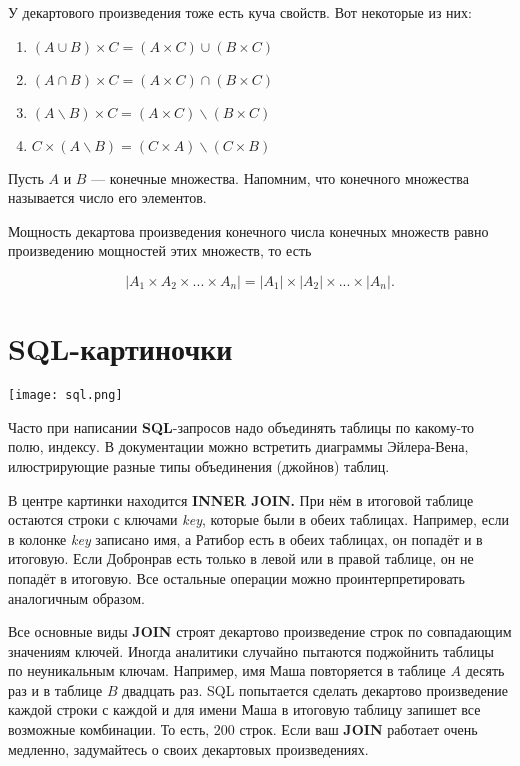 \documentclass[12pt, a4paper]{article}
\begin{document}
У декартового произведения тоже есть куча свойств. Вот некоторые из них:

\begin{enumerate}
    \item $(A \cup B) \times C = (A \times C) \cup (B \times C)$
    \item $(A \cap B) \times C = (A \times C) \cap (B \times C)$
    \item $(A \backslash B) \times C = (A \times C) \backslash (B \times C)$
    \item $C \times  (A \backslash B) = (C \times A) \backslash (C \times B)$
\end{enumerate}

Пусть $A$ и $B$ --- конечные множества. Напомним, что  конечного множества называется число его элементов. 

\begin{myth}
Мощность декартова произведения конечного числа конечных множеств равно произведению мощностей этих множеств, то есть 

\[
|A_1 \times A_2 \times ... \times  A_n| = |A_1| \times |A_2| \times ... \times |A_n|.
\]
\end{myth}

\section{SQL-картиночки}

\begin{center}
    \texttt{[image: sql.png]}
\end{center}

Часто при написании \textbf{SQL}-запросов надо объединять таблицы по какому-то полю, индексу. В документации можно встретить диаграммы Эйлера-Вена, илюстрирующие разные типы объединения (джойнов) таблиц.

В центре картинки находится \textbf{INNER JOIN.} При нём в итоговой таблице остаются строки с ключами \textit{key}, которые были в обеих таблицах. Например, если в колонке  \textit{key} записано имя, а Ратибор есть в обеих таблицах, он попадёт и в итоговую. Если Добронрав есть только в левой или в правой таблице, он не попадёт в итоговую. Все остальные операции можно проинтерпретировать аналогичным образом.

Все основные виды \textbf{JOIN} строят декартово произведение строк по совпадающим значениям ключей. Иногда аналитики случайно пытаются поджойнить таблицы по неуникальным ключам. Например, имя Маша повторяется в таблице $A$ десять раз и в таблице $B$ двадцать раз. SQL попытается сделать декартово произведение каждой строки с каждой и для имени Маша в итоговую таблицу запишет все возможные комбинации. То есть, $200$ строк. Если ваш \textbf{JOIN} работает очень медленно, задумайтесь о своих декартовых произведениях. 
\end{document}
